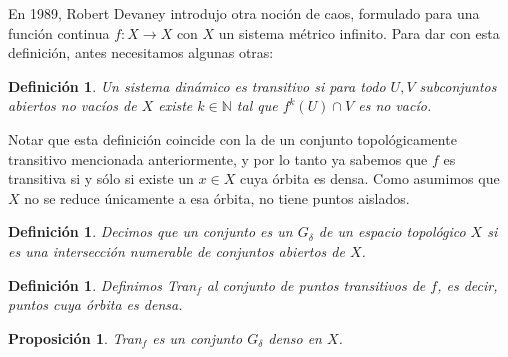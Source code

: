 \documentclass[12pt,a4paper]{article}
\newtheorem{proposition}[theorem]{Proposición}
\newtheorem{definition}[theorem]{Definición}
\begin{document}
En 1989, Robert Devaney introdujo otra noción de caos, formulado para una función continua $f: X \rightarrow X$ con $X$ un sistema métrico infinito. Para dar con esta definición, antes necesitamos algunas otras:
\begin{definition}
Un sistema dinámico es \textit{transitivo} si para todo $U, V$ subconjuntos abiertos no vacíos de $X$ existe $k \in \mathbb{N}$ tal que $f^k(U) \cap V$ es no vacío.
\end{definition}
Notar que esta definición coincide con la de un conjunto topológicamente transitivo mencionada anteriormente, y por lo tanto ya sabemos que $f$ es transitiva si y sólo si existe un $x \in X$ cuya órbita es densa. Como asumimos que $X$ no se reduce únicamente a esa órbita, no tiene puntos aislados.
\begin{definition}
Decimos que un conjunto es un $G_\delta$ de un espacio topológico $X$ si es una intersección numerable de conjuntos abiertos de $X$.
\end{definition}
\begin{definition}
Definimos Tran$_{f}$ al conjunto de puntos transitivos de $f$, es decir, puntos cuya órbita es densa.
\end{definition}
\begin{proposition}
    Tran$_{f}$ es un conjunto $G_\delta$ denso en $X$.  
\end{proposition}
\end{document}
